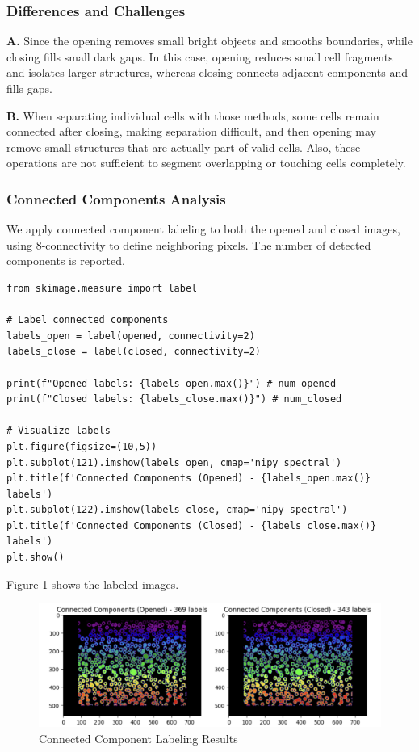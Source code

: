 \documentclass[12pt]{article}
\begin{document}
\subsubsection{Differences and Challenges} %
\textbf{A. } Since the opening removes small bright objects and smooths boundaries, while closing fills small dark gaps. In this case, opening reduces small cell fragments and isolates larger structures, whereas closing connects adjacent components and fills gaps.

\textbf{B. } When separating individual cells with those methods, some cells remain connected after closing, making separation difficult, and then opening may remove small structures that are actually part of valid cells. Also, these operations are not sufficient to segment overlapping or touching cells completely.

\subsubsection{Connected Components Analysis} %
We apply connected component labeling to both the opened and closed images, using 8-connectivity to define neighboring pixels. The number of detected components is reported.

\begin{lstlisting}
from skimage.measure import label

# Label connected components
labels_open = label(opened, connectivity=2)
labels_close = label(closed, connectivity=2)

print(f"Opened labels: {labels_open.max()}") # num_opened
print(f"Closed labels: {labels_close.max()}") # num_closed

# Visualize labels
plt.figure(figsize=(10,5))
plt.subplot(121).imshow(labels_open, cmap='nipy_spectral')
plt.title(f'Connected Components (Opened) - {labels_open.max()} labels')
plt.subplot(122).imshow(labels_close, cmap='nipy_spectral')
plt.title(f'Connected Components (Closed) - {labels_close.max()} labels')
plt.show()
\end{lstlisting}

Figure \ref{fig:connected_components} shows the labeled images. 

\begin{figure}[ht]
    \centering
        \includegraphics[width=\textwidth]{pics/a7-4.1.3}
    \caption{Connected Component Labeling Results}
    \label{fig:connected_components}
\end{figure}
\end{document}
